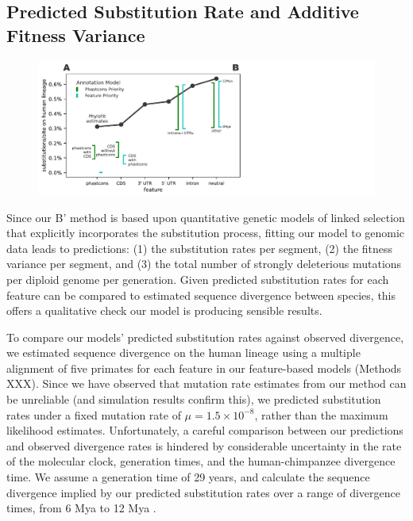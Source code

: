 \documentclass[11pt]{article}
\begin{document}
\subsection*{Predicted Substitution Rate and Additive Fitness Variance}

\begin{figure}[htbp] \centering
    \includegraphics[width=\textwidth]{figures/figure_7.pdf} 

    \caption{}

  \label{fig:figure-6}
\end{figure}

Since our B' method is based upon quantitative genetic models of linked
selection that explicitly incorporates the substitution process, fitting our
model to genomic data leads to predictions: (1) the substitution rates per
segment, (2) the fitness variance per segment, and (3) the total number of
strongly deleterious mutations per diploid genome per generation. Given
predicted substitution rates for each feature can be compared to estimated
sequence divergence between species, this offers a qualitative check our model
is producing sensible results. 

To compare our models' predicted substitution rates against observed
divergence, we estimated sequence divergence on the human lineage using a
multiple alignment of five primates for each feature in our feature-based
models (Methods XXX). Since we have observed that mutation rate estimates from
our method can be unreliable (and simulation results confirm this), we
predicted substitution rates under a fixed mutation rate of $\mu = 1.5 \times
10^{-8}$, rather than the maximum likelihood estimates. Unfortunately, a
careful comparison between our predictions and observed divergence rates is
hindered by considerable uncertainty in the rate of the molecular clock,
generation times, and the human-chimpanzee divergence time. We assume a
generation time of 29 years, and calculate the sequence divergence implied by
our predicted substitution rates over a range of divergence times, from 6 Mya
to 12 Mya \parencite{Moorjani2016-tb,Nachman2000-te,Yi2002-pw,Steiper2006-xx}.
\end{document}
